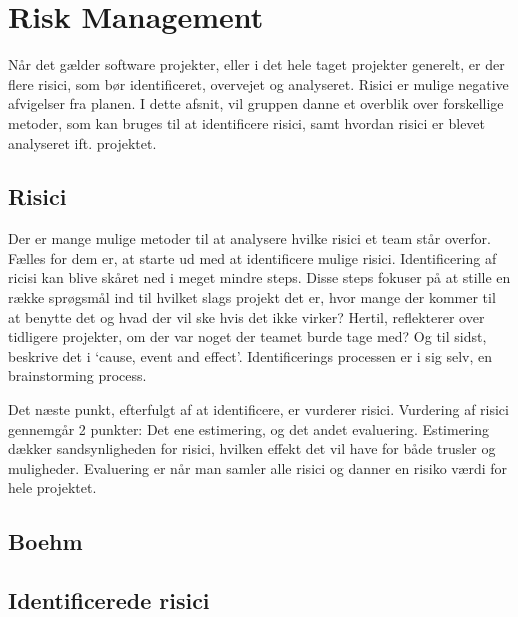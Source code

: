 \chapter{Risk Management}\label{ch:Risk Management}

Når det gælder software projekter, eller i det hele taget projekter generelt, er der flere risici, som bør identificeret, overvejet og analyseret. Risici er mulige negative afvigelser fra planen.\cite{SlideRiskAnalysis} I dette afsnit, vil gruppen danne et overblik over forskellige metoder, som kan bruges til at identificere risici, samt hvordan risici er blevet analyseret ift. projektet.

\section{Risici}

Der er mange mulige metoder til at analysere hvilke risici et team står overfor. Fælles for dem er, at starte ud med at identificere mulige risici.
Identificering af ricisi kan blive skåret ned i meget mindre steps. \cite{SlideRiskAnalysis} Disse steps fokuser på at stille en række sprøgsmål ind til hvilket slags projekt det er, hvor mange der kommer til at benytte det og hvad der vil ske hvis det ikke virker? Hertil, reflekterer over tidligere projekter, om der var noget der teamet burde tage med? Og til sidst, beskrive det i ‘cause, event and effect’. Identificerings processen er i sig selv, en brainstorming process.

Det næste punkt, efterfulgt af at identificere, er vurderer risici. Vurdering af risici gennemgår 2 punkter: Det ene estimering, og det andet evaluering. Estimering dækker sandsynligheden for risici, hvilken effekt det vil have for både trusler og muligheder. Evaluering er når man samler alle risici og danner en risiko værdi for hele projektet.


\section{Boehm}


\section{Identificerede risici}
